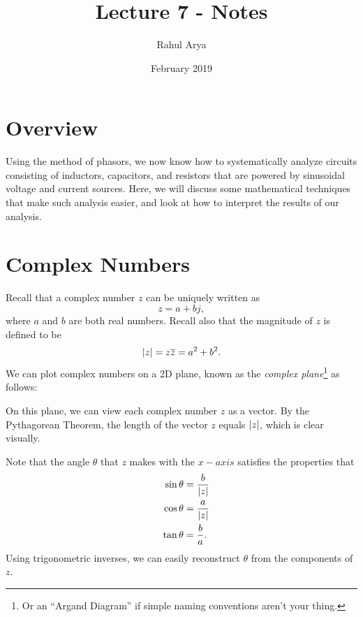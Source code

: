 \documentclass[letterpaper]{article}
\title{Lecture 7 - Notes}
\author{Rahul Arya}
\date{February 2019}
\theoremstyle{remark}
\DeclarePairedDelimiter\abs{\lvert}{\rvert}%
\newcommand{\eqn}[1]{\begin{alignat*}{2}#1\end{alignat*}}
\begin{document}
\maketitle

\section{Overview}
Using the method of phasors, we now know how to systematically analyze circuits consisting of inductors, capacitors, and resistors that are powered by sinusoidal voltage and current sources. Here, we will discuss some mathematical techniques that make such analysis easier, and look at how to interpret the results of our analysis.

\section{Complex Numbers}
Recall that a complex number $z$ can be uniquely written as
\[
    z = a + bj,
\]
where $a$ and $b$ are both real numbers. Recall also that the magnitude of $z$ is defined to be
\[
    \abs{z} = z\overline{z} = a^2 + b^2.
\]
We can plot complex numbers on a 2D plane, known as the \emph{complex plane}\footnote{Or an ``Argand Diagram'' if simple naming conventions aren't your thing.} as follows:
\begin{center}
\end{center}
On this plane, we can view each complex number $z$ as a vector. By the Pythagorean Theorem, the length of the vector $z$ equals $\abs{z}$, which is clear visually.

Note that the angle $\theta$ that $z$ makes with the $x-axis$ satisfies the properties that
\eqn{
    && \sin{\theta} &= \frac{b}{\abs{z}} \\
    && \cos{\theta} &= \frac{a}{\abs{z}} \\
    && \tan{\theta} &= \frac{b}{a}. \\
}
Using trigonometric inverses, we can easily reconstruct $\theta$ from the components of $z$.
\end{document}
